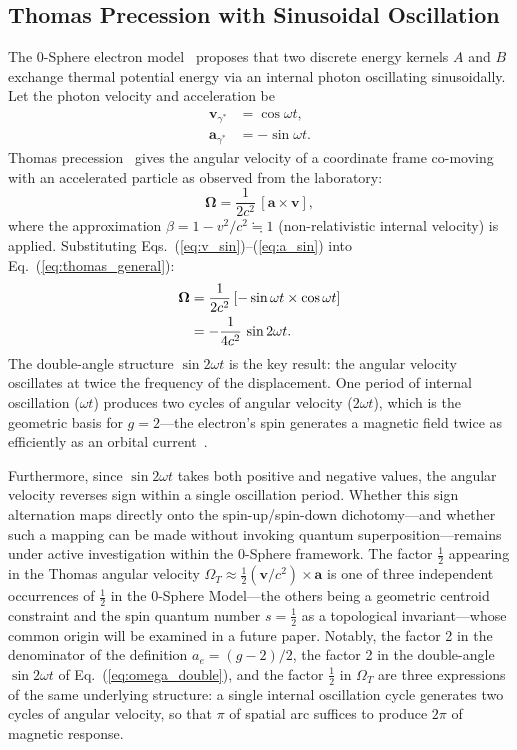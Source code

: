 \documentclass[%
 reprint, amsmath,amssymb, aps, prb, ]{revtex4-2}
\numberwithin{equation}{section}
\begin{document}
\subsection{\label{sec:thomas}Thomas Precession with Sinusoidal Oscillation}

The 0-Sphere electron model~\cite{Hanamura_2018_01} proposes that two discrete energy kernels $A$ and $B$ exchange thermal potential energy via an internal photon oscillating sinusoidally. Let the photon velocity and acceleration be
\begin{align}
\boldsymbol{v}_{\gamma^*} &= \cos\omega t, \label{eq:v_sin} \\
\boldsymbol{a}_{\gamma^*} &= -\sin\omega t. \label{eq:a_sin}
\end{align}
Thomas precession~\cite{Thomas1926} gives the angular velocity of a coordinate frame co-moving with an accelerated particle as observed from the laboratory:
\begin{equation}
\boldsymbol{\Omega} = \frac{1}{2c^2}\,[\boldsymbol{a} \times \boldsymbol{v}],
\label{eq:thomas_general}
\end{equation}
where the approximation $\beta = 1 - v^2/c^2 \fallingdotseq 1$ (non-relativistic internal velocity) is applied. Substituting Eqs.~(\ref{eq:v_sin})--(\ref{eq:a_sin}) into Eq.~(\ref{eq:thomas_general}):
\begin{align}
\boldsymbol{\Omega}
&= \frac{1}{2c^2}\,[-\sin\omega t \times \cos\omega t] \notag \\
&= -\frac{1}{4c^2}\,\sin 2\omega t.
\label{eq:omega_double}
\end{align}
The double-angle structure $\sin 2\omega t$ is the key result: the angular velocity oscillates at twice the frequency of the displacement. One period of internal oscillation ($\omega t$) produces two cycles of angular velocity ($2\omega t$), which is the geometric basis for $g = 2$---the electron's spin generates a magnetic field twice as efficiently as an orbital current~\cite{Hanamura_2023_10,Hanamura_2025_13,Hanamura_2025_19}.

Furthermore, since $\sin 2\omega t$ takes both positive and negative values, the angular velocity reverses sign within a single oscillation period. Whether this sign alternation maps directly onto the spin-up/spin-down dichotomy---and whether such a mapping can be made without invoking quantum superposition---remains under active investigation within the 0-Sphere framework. The factor $\tfrac{1}{2}$ appearing in the Thomas angular velocity $\Omega_T \approx \tfrac{1}{2}(\mathbf{v}/c^2)\times\mathbf{a}$ is one of three independent occurrences of $\tfrac{1}{2}$ in the 0-Sphere Model---the others being a geometric centroid constraint and the spin quantum number $s=\tfrac{1}{2}$ as a topological invariant---whose common origin will be examined in a future paper. Notably, the factor 2 in the denominator of the definition $a_e = (g-2)/2$, the factor 2 in the double-angle $\sin 2\omega t$ of Eq.~(\ref{eq:omega_double}), and the factor $\tfrac{1}{2}$ in $\Omega_T$ are three expressions of the same underlying structure: a single internal oscillation cycle generates two cycles of angular velocity, so that $\pi$ of spatial arc suffices to produce $2\pi$ of magnetic response.
\end{document}
